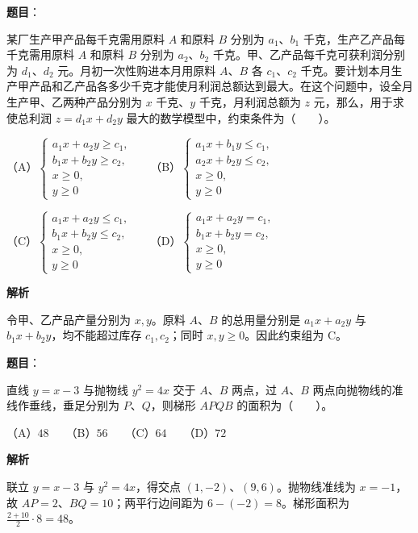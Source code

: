 \begin{answer}

\textbf{题目}：

某厂生产甲产品每千克需用原料 $A$ 和原料 $B$ 分别为 $a_1\text{、}b_1$ 千克，生产乙产品每千克需用原料 $A$ 和原料 $B$ 分别为 $a_2\text{、}b_2$ 千克。甲、乙产品每千克可获利润分别为 $d_1\text{、}d_2$ 元。月初一次性购进本月用原料 $A\text{、}B$ 各 $c_1\text{、}c_2$ 千克。要计划本月生产甲产品和乙产品各多少千克才能使月利润总额达到最大。在这个问题中，设全月生产甲、乙两种产品分别为 $x$ 千克、$y$ 千克，月利润总额为 $z$ 元，那么，用于求使总利润 $z=d_1x+d_2y$ 最大的数学模型中，约束条件为\mbox{（　　）}。

（A）$\begin{cases}a_1x+a_2y\geqslant c_1,\\b_1x+b_2y\geqslant c_2,\\x\geqslant0,\\y\geqslant0\end{cases}$　　（B）$\begin{cases}a_1x+b_1y\leqslant c_1,\\a_2x+b_2y\leqslant c_2,\\x\geqslant0,\\y\geqslant0\end{cases}$

（C）$\begin{cases}a_1x+a_2y\leqslant c_1,\\b_1x+b_2y\leqslant c_2,\\x\geqslant0,\\y\geqslant0\end{cases}$　　（D）$\begin{cases}a_1x+a_2y=c_1,\\b_1x+b_2y=c_2,\\x\geqslant0,\\y\geqslant0\end{cases}$

\textbf{解析}

令甲、乙产品产量分别为 $x,y$。原料 $A$、$B$ 的总用量分别是 $a_1x+a_2y$ 与 $b_1x+b_2y$，均不能超过库存 $c_1,c_2$；同时 $x,y\geqslant0$。因此约束组为 C。


\end{answer}
\begin{answer}

\textbf{题目}：

直线 $y=x-3$ 与抛物线 $y^2=4x$ 交于 $A\text{、}B$ 两点，过 $A\text{、}B$ 两点向抛物线的准线作垂线，垂足分别为 $P\text{、}Q$，则梯形 $APQB$ 的面积为\mbox{（　　）}。

（A）$48$　　（B）$56$　　（C）$64$　　（D）$72$

\textbf{解析}

联立 $y=x-3$ 与 $y^2=4x$，得交点 $(1,-2)\text{、}(9,6)$。抛物线准线为 $x=-1$，故 $AP=2\text{、}BQ=10$；两平行边间距为 $6-(-2)=8$。梯形面积为 $\frac{2+10}{2}\cdot8=48$。


\end{answer}
